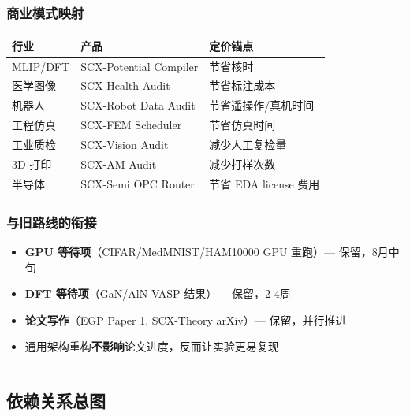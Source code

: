 \documentclass[
  12pt,
]{ctexart}
\providecommand{\tightlist}{%
  \setlength{\itemsep}{0pt}\setlength{\parskip}{0pt}}
\begin{document}
\subsubsection{商业模式映射}\label{ux5546ux4e1aux6a21ux5f0fux6620ux5c04}

\begin{longtable}[]{@{}lll@{}}
\toprule\noalign{}
行业 & 产品 & 定价锚点 \\
\midrule\noalign{}
\endhead
\bottomrule\noalign{}
\endlastfoot
MLIP/DFT & SCX-Potential Compiler & 节省核时 \\
医学图像 & SCX-Health Audit & 节省标注成本 \\
机器人 & SCX-Robot Data Audit & 节省遥操作/真机时间 \\
工程仿真 & SCX-FEM Scheduler & 节省仿真时间 \\
工业质检 & SCX-Vision Audit & 减少人工复检量 \\
3D 打印 & SCX-AM Audit & 减少打样次数 \\
半导体 & SCX-Semi OPC Router & 节省 EDA license 费用 \\
\end{longtable}

\subsubsection{与旧路线的衔接}\label{ux4e0eux65e7ux8defux7ebfux7684ux8854ux63a5}

\begin{itemize}
\tightlist
\item
  \textbf{GPU 等待项}（CIFAR/MedMNIST/HAM10000 GPU 重跑）---
  保留，8月中旬
\item
  \textbf{DFT 等待项}（GaN/AlN VASP 结果）--- 保留，2-4周
\item
  \textbf{论文写作}（EGP Paper 1, SCX-Theory arXiv）--- 保留，并行推进
\item
  通用架构重构\textbf{不影响}论文进度，反而让实验更易复现
\end{itemize}

\begin{center}\rule{0.5\linewidth}{0.5pt}\end{center}

\subsection{依赖关系总图}\label{ux4f9dux8d56ux5173ux7cfbux603bux56fe}
\end{document}
